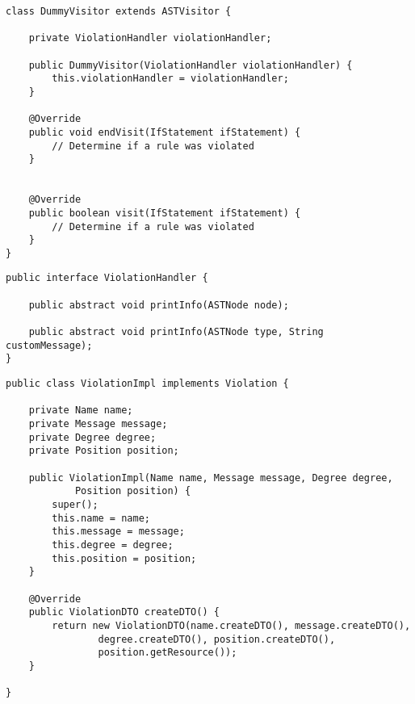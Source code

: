 \begin{lstlisting}[caption=\textit{DummyVisitor} is an example for a concrete visitor that is validating one rule of the Object Calisthenics]
class DummyVisitor extends ASTVisitor {

	private ViolationHandler violationHandler;

	public DummyVisitor(ViolationHandler violationHandler) {
		this.violationHandler = violationHandler;
	}

	@Override
	public void endVisit(IfStatement ifStatement) {
		// Determine if a rule was violated
	}


	@Override
	public boolean visit(IfStatement ifStatement) {
		// Determine if a rule was violated
	}
}

\end{lstlisting}
\label{listing:simplevisitor}

\begin{lstlisting}[caption=\textit{ViolationHandler}]
public interface ViolationHandler {

	public abstract void printInfo(ASTNode node);

	public abstract void printInfo(ASTNode type, String customMessage);
}
\end{lstlisting}
\label{listing:violationhandlerinterface}

\begin{lstlisting}[caption=\textit{ViolaitonImpl}]
public class ViolationImpl implements Violation {

	private Name name;
	private Message message;
	private Degree degree;
	private Position position;

	public ViolationImpl(Name name, Message message, Degree degree,
			Position position) {
		super();
		this.name = name;
		this.message = message;
		this.degree = degree;
		this.position = position;
	}

	@Override
	public ViolationDTO createDTO() {
		return new ViolationDTO(name.createDTO(), message.createDTO(),
				degree.createDTO(), position.createDTO(),
				position.getResource());
	}

}
\end{lstlisting}
\label{listing:violationdomain}